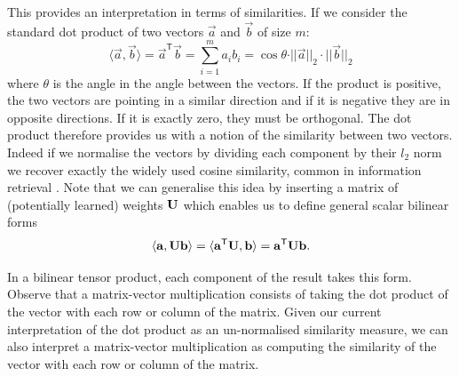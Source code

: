 This provides an interpretation
in terms of similarities. If we consider the standard dot product of two vectors 
\(\vec{a}\) and
\(\vec{b}\) of size \(m\): 
\begin{equation}
\langle\vec{a}, \vec{b}\rangle = 
\vec{a}^\mathsf{T}\vec{b}
= \sum_{i=1}^ma_ib_i
 = {\cos\theta}{\cdot||\vec{a}||_2\cdot||\vec{b}||_2} 
\end{equation} where
\(\theta\) is the angle in the angle between the vectors. If the product
is positive, the two vectors are pointing in a similar direction and if it is negative they
are in opposite directions. If it is exactly zero, they must be orthogonal. The dot product
therefore provides us with a notion of the similarity between two vectors.
Indeed if we normalise the vectors by dividing each component by their \(l_2\) norm we
recover exactly the widely used cosine similarity, common in information retrieval 
\autocite{Singhal2001, Tan2006} . Note that
we can generalise this idea by inserting a matrix of (potentially learned)
weights \(\mathbf{U}\) which enables us
to define general scalar bilinear forms
\begin{equation}
	\langle\mathbf{a}, \mathbf{U}\mathbf{b}\rangle = \langle\mathbf{a}^\mathsf{T}\mathbf{U}, \mathbf{b}\rangle
	= \mathbf{a}^\mathsf{T}\mathbf{U}\mathbf{b}.
\end{equation}

In a bilinear tensor product, each component of the result takes this form.
Observe that a matrix-vector multiplication consists of
taking the dot product of the vector with each row or column of the matrix. Given our current
interpretation of the dot product as an un-normalised similarity measure, we can also
interpret a matrix-vector multiplication as computing the similarity of the vector with each
row or column of the matrix. 

